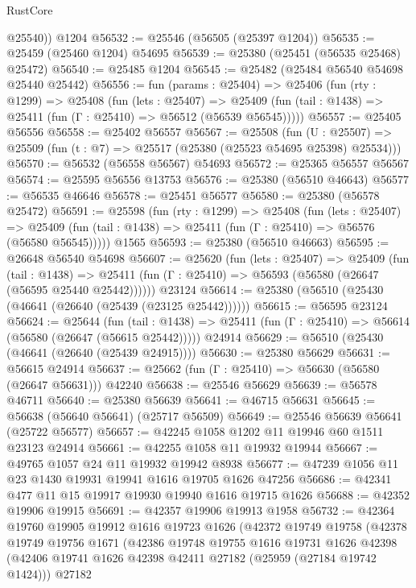\begin{lexlean}{RustCore}
\begin{coremodule}
        @25540))
    @1204
@56532 := @25546 (@56505 (@25397 @1204))
@56535 := @25459 (@25460 @1204) @54695
@56539 := @25380 (@25451 (@56535 @25468) @25472)
@56540 := @25485 @1204
@56545 := @25482 (@25484 @56540 @54698 @25440 @25442)
@56556 := fun (params : @25404) =>
  @25406
    (fun (rty : @1299) =>
    @25408
      (fun (lets : @25407) =>
      @25409 (fun (tail : @1438) => @25411 (fun (Γ : @25410) => @56512 (@56539 @56545)))))
@56557 := @25405 @56556
@56558 := @25402 @56557
@56567 := @25508
    (fun (U : @25507) => @25509 (fun (t : @7) => @25517 (@25380 (@25523 @54695 @25398) @25534)))
@56570 := @56532 (@56558 @56567) @54693
@56572 := @25365 @56557 @56567
@56574 := @25595 @56556 @13753
@56576 := @25380 (@56510 @46643)
@56577 := @56535 @46646
@56578 := @25451 @56577
@56580 := @25380 (@56578 @25472)
@56591 := @25598
    (fun (rty : @1299) =>
    @25408
      (fun (lets : @25407) =>
      @25409 (fun (tail : @1438) => @25411 (fun (Γ : @25410) => @56576 (@56580 @56545)))))
    @1565
@56593 := @25380 (@56510 @46663)
@56595 := @26648 @56540 @54698
@56607 := @25620
    (fun (lets : @25407) =>
    @25409
      (fun (tail : @1438) =>
      @25411 (fun (Γ : @25410) => @56593 (@56580 (@26647 (@56595 @25440 @25442))))))
    @23124
@56614 := @25380 (@56510 (@25430 (@46641 (@26640 (@25439 (@23125 @25442))))))
@56615 := @56595 @23124
@56624 := @25644
    (fun (tail : @1438) => @25411 (fun (Γ : @25410) => @56614 (@56580 (@26647 (@56615 @25442)))))
    @24914
@56629 := @56510 (@25430 (@46641 (@26640 (@25439 @24915))))
@56630 := @25380 @56629
@56631 := @56615 @24914
@56637 := @25662 (fun (Γ : @25410) => @56630 (@56580 (@26647 @56631))) @42240
@56638 := @25546 @56629
@56639 := @56578 @46711
@56640 := @25380 @56639
@56641 := @46715 @56631
@56645 := @56638 (@56640 @56641) (@25717 @56509)
@56649 := @25546 @56639 @56641 (@25722 @56577)
@56657 := @42245 @1058 @1202 @11 @19946 @60 @1511 @23123 @24914
@56661 := @42255 @1058 @11 @19932 @19944
@56667 := @49765 @1057 @24 @11 @19932 @19942 @8938
@56677 := @47239 @1056 @11 @23 @1430 @19931 @19941 @1616 @19705 @1626 @47256
@56686 := @42341 @477 @11 @15 @19917 @19930 @19940 @1616 @19715 @1626
@56688 := @42352 @19906 @19915
@56691 := @42357 @19906 @19913 @1958
@56732 := @42364
    @19760
    @19905
    @19912
    @1616
    @19723
    @1626
    (@42372
      @19749
      @19758
      (@42378
        @19749
        @19756
        @1671
        (@42386
          @19748
          @19755
          @1616
          @19731
          @1626
          @42398
          (@42406 @19741 @1626 @42398 @42411 @27182 (@25959 (@27184 @19742 @1424)))
          @27182

\end{coremodule}
\end{lexlean}

